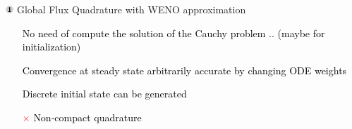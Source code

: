 \begin{frame}[t]{\includegraphics[width=0.3cm]{circle1} Global Flux Quadrature  with WENO approximation}
{\begin{enumerate}
\vspace{0.2cm}

\item[\textcolor{mblue1}{\Large\checkmark}] \textcolor{black}{No need of compute the solution of the Cauchy problem .. (maybe for initialization)}  

\vspace{0.2cm}

\item[\textcolor{mblue1}{\Large\checkmark}]  \textcolor{black}{Convergence at steady state arbitrarily accurate by changing ODE weights} 

\vspace{0.2cm}

\item[\textcolor{mblue1}{\Large\checkmark}]   \textcolor{black}{Discrete initial state can be generated}

\vspace{0.2cm}

\item[\textcolor{red}{\Large$\times$}]   \textcolor{black}{Non-compact quadrature }
\end{enumerate}

}

\end{frame}
% 